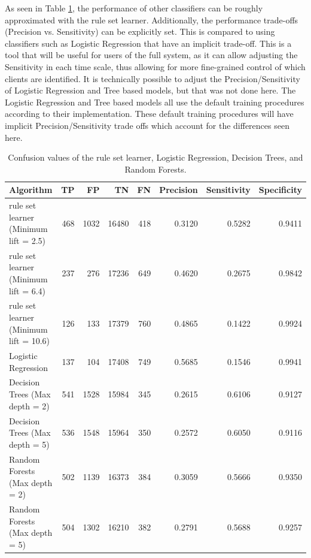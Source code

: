 As seen in Table \ref{tbl:results:30}, the performance of other classifiers can be roughly approximated with the \Abb rule set learner. Additionally, the performance trade-offs (Precision vs. Sensitivity) can be explicitly set. This is compared to using classifiers such as Logistic Regression that have an implicit trade-off. This is a tool that will be useful for users of the full \Abb system, as it can allow adjusting the Sensitivity in each time scale, thus allowing for more fine-grained control of which clients are identified. It is technically possible to adjust the Precision/Sensitivity of Logistic Regression and Tree based models, but that was not done here. The Logistic Regression and Tree based models all use the default training procedures according to their implementation. These default training procedures will have implicit Precision/Sensitivity trade offs which account for the differences seen here.

\begin{table}[h]
	\centering

	\begin{tabular}{p{}rrrrrrr}
	\toprule
	{Algorithm} &    TP &     FP &      TN &    FN &  Precision &  Sensitivity &  Specificity \\
	\midrule
	\Abb rule set learner (Minimum lift = 2.5) & 468 & 1032 & 16480 & 418 & 0.3120 & 0.5282 & 0.9411 \\
	\Abb rule set learner (Minimum lift = 6.4) & 237 & 276 & 17236 & 649 & 0.4620 & 0.2675 & 0.9842 \\
	\Abb rule set learner (Minimum lift = 10.6) & 126 & 133 & 17379 & 760 & 0.4865 & 0.1422 & 0.9924 \\
	Logistic Regression & 137 & 104 & 17408 & 749 & 0.5685 & 0.1546 & 0.9941 \\
	Decision Trees (Max depth = 2) & 541 & 1528 & 15984 & 345 & 0.2615 & 0.6106 & 0.9127 \\
	Decision Trees (Max depth = 5) & 536 & 1548 & 15964 & 350 & 0.2572 & 0.6050 & 0.9116 \\
	Random Forests (Max depth = 2) & 502 & 1139 & 16373 & 384 & 0.3059 & 0.5666 & 0.9350 \\
	Random Forests (Max depth = 5) & 504 & 1302 & 16210 & 382 & 0.2791 & 0.5688 & 0.9257 \\

	\bottomrule
	\end{tabular}

	\caption{Confusion values of the \Abb rule set learner, Logistic Regression, Decision Trees, and Random Forests.}
	\label{tbl:results:30}
\end{table}


